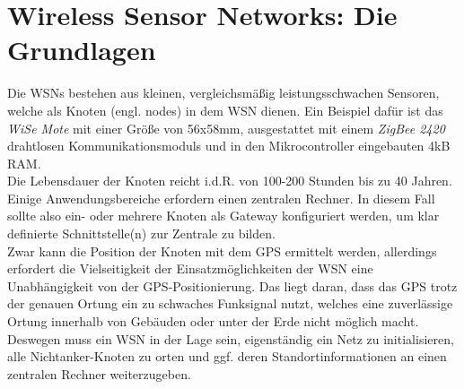 \documentclass[12pt, a4wide]{scrreprt}
\begin{document}
\chapter{Wireless Sensor Networks: Die Grundlagen}

Die WSNs bestehen aus kleinen, vergleichsmäßig leistungsschwachen Sensoren, welche als Knoten (engl. nodes) in dem WSN dienen. Ein Beispiel dafür ist das \textit{WiSe Mote} mit einer Größe von 56x58mm, ausgestattet mit einem \textit{ZigBee 2420} drahtlosen Kommunikationsmoduls und in den Mikrocontroller eingebauten 4kB RAM\cite{WiSe}.\\
\indent
Die Lebensdauer der Knoten reicht i.d.R. von 100-200 Stunden\cite{lifetime_study} bis zu 40 Jahren.\\
\indent
Einige Anwendungsbereiche erfordern einen zentralen Rechner. In diesem Fall sollte also ein- oder mehrere Knoten als Gateway konfiguriert werden, um klar definierte Schnittstelle(n) zur Zentrale zu bilden.\\
\indent
Zwar kann die Position der Knoten mit dem GPS ermittelt werden, allerdings erfordert die Vielseitigkeit der Einsatzmöglichkeiten der WSN eine Unabhängigkeit von der GPS-Positionierung. Das liegt daran, dass das GPS trotz der genauen Ortung ein zu schwaches Funksignal nutzt, welches eine zuverlässige  Ortung innerhalb von Gebäuden oder unter der Erde nicht möglich macht. Deswegen muss ein WSN in der Lage sein, eigenständig ein Netz zu initialisieren, alle Nichtanker-Knoten zu orten und ggf. deren Standortinformationen an einen zentralen Rechner weiterzugeben.

\end{document}
